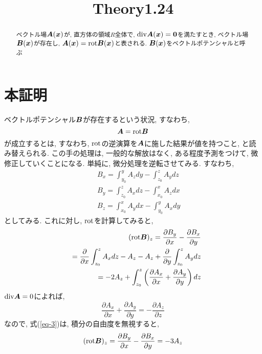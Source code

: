 \documentclass{jsarticle} \usepackage[dvipdfmx]{graphicx} \usepackage[dvipdfmx]{hyperref}
\title{Theory1.24}
\newcommand*{\mbold}[1]{\mbox{\boldmath $#1$}}
\newcommand*{\divg}{{\rm div}}
\newcommand*{\rot}{{\rm rot}}
\begin{document}
\maketitle

\begin{abstract}
  ベクトル場$\mbold{A}(\mbold{x})$が, 直方体の領域$R$全体で, $\divg \mbold{A}(\mbold{x}) = \mbold{0}$を満たすとき, ベクトル場$\mbold{B}(\mbold{x})$が存在し, 
  $\mbold{A}(\mbold{x}) = \rot \mbold{B}(\mbold{x})$と表される. 
  $\mbold{B}(\mbold{x})$をベクトルポテンシャルと呼ぶ
\end{abstract}

\section*{本証明}
ベクトルポテンシャル$\mbold{B}$が存在するという状況, すなわち, 
\begin{equation}\label{eq-2}
  \mbold{A} = \rot\mbold{B}
\end{equation}
が成立するとは, すなわち, $\rot$の逆演算を$\mbold{A}$に施した結果が値を持つこと, と読み替えられる. 
この手の処理は, 一般的な解放はなく, ある程度予測をつけて, 微修正していくことになる.  
単純に, 微分処理を逆転させてみる. 
すなわち, 
\begin{subequations}
  \begin{eqnarray}
    && B_x = \int_{y_0}^y A_z dy - \int_{z_0}^z A_y dz \\
    && B_y = \int_{z_0}^z A_x dz - \int_{x_0}^x A_z dx \\
    && B_z = \int_{x_0}^x A_y dx - \int_{y_0}^y A_x dy
  \end{eqnarray}
\end{subequations}
としてみる. これに対し, $\rot$を計算してみると, 
\begin{eqnarray}\label{eq-3}
  && (\rot\mbold{B})_z = \frac{\partial B_y}{\partial x} - \frac{\partial B_x}{\partial y} \nonumber \\
  && = \frac{\partial}{\partial x}\int_{z_0}^z A_x dz - A_z 
    - A_z + \frac{\partial}{\partial y}\int_{z_0}^z A_y dz \nonumber \\
  && = -2 A_z + \int_{z_0}^z \left(\frac{\partial A_x}{\partial x} + \frac{\partial A_y}{\partial y}\right)dz 
\end{eqnarray}
$\divg\mbold{A} = 0$によれば, 
\[
  \frac{\partial A_x}{\partial x} + \frac{\partial A_y}{\partial y} = -\frac{\partial A_z}{\partial z}
\]
なので, 式(\ref{eq-3})は, 積分の自由度を無視すると,  
\begin{equation}
  (\rot\mbold{B})_z = \frac{\partial B_y}{\partial x} - \frac{\partial B_x}{\partial y}
  = -3 A_z
\end{equation}
\end{document}
